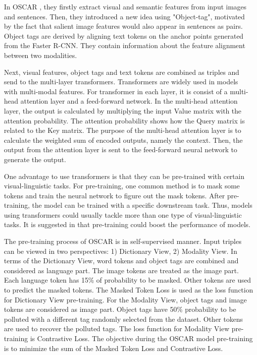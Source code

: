 \documentclass[12pt, a4paper]{article}
\begin{document}
\par\noindent \newline In OSCAR \cite{DBLP:journals/corr/abs-2004-06165}, they firstly extract visual and semantic features from input images and sentences. Then, they introduced a new idea using "Object-tag", motivated by the fact that salient image features would also appear in sentences as pairs. Object tags are derived by aligning text tokens on the anchor points generated from the Faster R-CNN. They contain information about the feature alignment between two modalities. 

\par\noindent \newline Next, visual features, object tags and text tokens are combined as triples and send to the multi-layer transformers. Transformers are widely used in models with multi-modal features. For transformer \cite{DBLP:journals/corr/VaswaniSPUJGKP17} in each layer, it is consist of a multi-head attention layer and a feed-forward network. In the multi-head attention layer, the output is calculated by multiplying the input Value matrix with the attention probability. The attention probability shows how the Query matrix is related to the Key matrix. The purpose of the multi-head attention layer is to calculate the weighted sum of encoded outputs, namely the context. Then, the output from the attention layer is sent to the feed-forward neural network to generate the output. 

\par\noindent \newline One advantage to use transformers is that they can be pre-trained with certain visual-linguistic tasks. For pre-training, one common method is to mask some tokens and train the neural network to figure out the mask tokens. After pre-training, the model can be trained with a specific downstream task. Thus, models using transformers could usually tackle more than one type of visual-linguistic tasks. It is suggested in \cite{DBLP:journals/corr/abs-2101-11562} that pre-training could boost the performance of models. 

\par\noindent \newline The pre-training process of OSCAR \cite{DBLP:journals/corr/abs-2004-06165} is in self-supervised manner. Input triples can be viewed in two perspectives: 1) Dictionary View, 2) Modality View. In terms of the Dictionary View, word tokens and object tags are combined and considered as language part. The image tokens are treated as the image part. Each language token has 15\% of probability to be masked. Other tokens are used to predict the masked tokens. The Masked Token Loss is used as the loss function for Dictionary View pre-training. For the Modality View, object tags and image tokens are considered as image part. Object tags have 50\% probability to be polluted with a different tag randomly selected from the dataset. Other tokens are used to recover the polluted tags. The loss function for Modality View pre-training is Contrastive Loss. The objective during the OSCAR model pre-training is to minimize the sum of the Masked Token Loss and Contrastive Loss.
\end{document}
